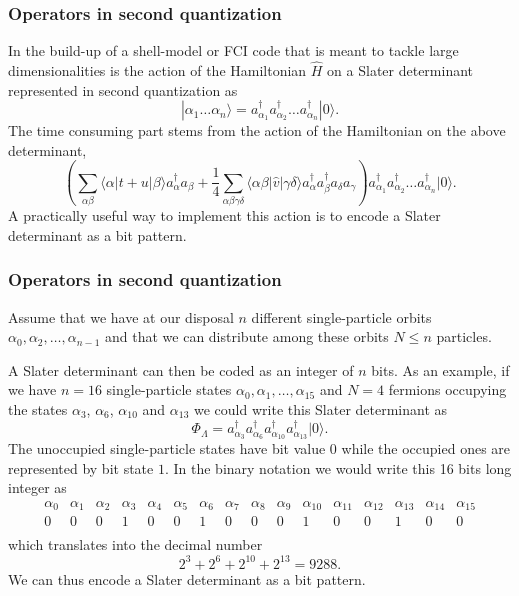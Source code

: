 \documentclass{beamer}
\begin{document}
\begin{frame}
\frametitle{Operators in second quantization}

\begin{block}{}
In the build-up of a shell-model or FCI code that is meant to tackle large dimensionalities
is the action of the Hamiltonian $\hat{H}$ on a
Slater determinant represented in second quantization as
\[
 |\alpha_1\dots \alpha_n\rangle = a_{\alpha_1}^{\dagger} a_{\alpha_2}^{\dagger} \dots a_{\alpha_n}^{\dagger} |0\rangle.
\]
The time consuming part stems from the action of the Hamiltonian
on the above determinant,
\[
\left(\sum_{\alpha\beta} \langle \alpha|t+u|\beta\rangle a_\alpha^{\dagger} a_\beta + \frac{1}{4} \sum_{\alpha\beta\gamma\delta}
                \langle \alpha \beta|\hat{v}|\gamma \delta\rangle a_\alpha^{\dagger} a_\beta^{\dagger} a_\delta a_\gamma\right)a_{\alpha_1}^{\dagger} a_{\alpha_2}^{\dagger} \dots a_{\alpha_n}^{\dagger} |0\rangle.
\]
A practically useful way to implement this action is to encode a Slater determinant as a bit pattern.
\end{block}
\end{frame}

\begin{frame}
\frametitle{Operators in second quantization}

\begin{block}{}
Assume that we have at our disposal $n$ different single-particle orbits
$\alpha_0,\alpha_2,\dots,\alpha_{n-1}$ and that we can distribute  among these orbits $N\le n$ particles.

A Slater  determinant can then be coded as an integer of $n$ bits. As an example, if we have $n=16$ single-particle states
$\alpha_0,\alpha_1,\dots,\alpha_{15}$ and $N=4$ fermions occupying the states $\alpha_3$, $\alpha_6$, $\alpha_{10}$ and $\alpha_{13}$
we could write this Slater determinant as  
\[
\Phi_{\Lambda} = a_{\alpha_3}^{\dagger} a_{\alpha_6}^{\dagger} a_{\alpha_{10}}^{\dagger} a_{\alpha_{13}}^{\dagger} |0\rangle.
\]
The unoccupied single-particle states have bit value $0$ while the occupied ones are represented by bit state $1$. 
In the binary notation we would write this   16 bits long integer as
\[
\begin{array}{cccccccccccccccc}
{\alpha_0}&{\alpha_1}&{\alpha_2}&{\alpha_3}&{\alpha_4}&{\alpha_5}&{\alpha_6}&{\alpha_7} & {\alpha_8} &{\alpha_9} & {\alpha_{10}} &{\alpha_{11}} &{\alpha_{12}} &{\alpha_{13}} &{\alpha_{14}} & {\alpha_{15}} \\
{0} & {0} &{0} &{1} &{0} &{0} &{1} &{0} &{0} &{0} &{1} &{0} &{0} &{1} &{0} & {0} \\
\end{array}
\]
which translates into the decimal number
\[
2^3+2^6+2^{10}+2^{13}=9288.
\]
We can thus encode a Slater determinant as a bit pattern.
\end{block}
\end{frame}
\end{document}
